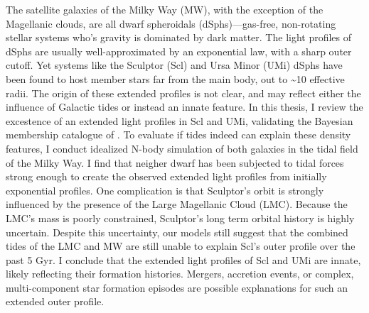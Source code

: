 The satellite galaxies of the Milky Way (MW), with the exception of the
Magellanic clouds, are all dwarf spheroidals (dSphs)---gas-free,
non-rotating stellar systems who's gravity is dominated by dark matter.
The light profiles of dSphs are usually well-approximated by an
exponential law, with a sharp outer cutoff. Yet systems like the
Sculptor (Scl) and Ursa Minor (UMi) dSphs have been found to host member
stars far from the main body, out to \textasciitilde10 effective radii.
The origin of these extended profiles is not clear, and may reflect
either the influence of Galactic tides or instead an innate feature. In
this thesis, I review the excestence of an extended light profiles in
Scl and UMi, validating the Bayesian membership catalogue of
\citet{jensen+2024}. To evaluate if tides indeed can explain these
density features, I conduct idealized N-body simulation of both galaxies
in the tidal field of the Milky Way. I find that neigher dwarf has been
subjected to tidal forces strong enough to create the observed extended
light profiles from initially exponential profiles. One complication is
that Sculptor's orbit is strongly influenced by the presence of the
Large Magellanic Cloud (LMC). Because the LMC's mass is poorly
constrained, Sculptor's long term orbital history is highly uncertain.
Despite this uncertainty, our models still suggest that the combined
tides of the LMC and MW are still unable to explain Scl's outer profile
over the past 5 Gyr. I conclude that the extended light profiles of Scl
and UMi are innate, likely reflecting their formation histories.
Mergers, accretion events, or complex, multi-component star formation
episodes are possible explanations for such an extended outer profile.
